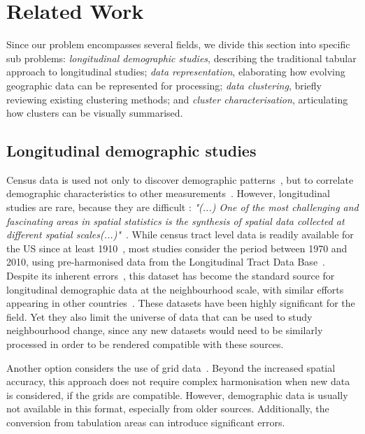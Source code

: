 \section{Related Work}
\label{sec:related}

Since our problem encompasses several fields, we divide this section into
specific sub problems: \emph{longitudinal demographic studies}, describing the
traditional tabular approach to longitudinal studies; \emph{data
representation}, elaborating how evolving geographic data can be represented for
processing; \emph{data clustering}, briefly reviewing existing clustering
methods; and \emph{cluster characterisation}, articulating how clusters can be
visually summarised.

\subsection{Longitudinal demographic studies}
Census data is used not only to discover demographic
patterns~\citep{Firebaugh2016}, but to correlate demographic characteristics to
other measurements~\citep{diez1997neighborhood}. However, longitudinal studies
are rare, because they are difficult : \emph{"(...) One of the most challenging
and fascinating areas in spatial statistics is the synthesis of spatial data
collected at different spatial scales(...)"}~\citep{gotway2002combining}. While
census tract level data is readily available for the US since at least
1910~\citep{nhgis}, most studies consider the period between 1970 and 2010,
using pre-harmonised data from the Longitudinal Tract Data
Base~\citep{Logan2014}. Despite its inherent
errors~\citep{Logan2016,Hallisey2017}, this dataset has become the standard
source for longitudinal demographic data at the neighbourhood scale, with
similar efforts appearing in other countries~\citep{Liu2015,Lee2015,Allen2018}.
These datasets have been highly significant for the field. Yet they also limit
the universe of  data that can be used to study neighbourhood change, since any
new datasets would need to be similarly processed in order to be rendered
compatible with these sources. 

Another option considers the use of grid
data~\citep{Dmowska2017,Dmowska2018,stepinski2019imperfect}. Beyond the
increased spatial accuracy, this approach does not require complex harmonisation
when new data is considered, if the grids are compatible. However, demographic
data is usually not available in this format, especially from older sources.
Additionally, the conversion from tabulation areas can introduce significant
errors.

